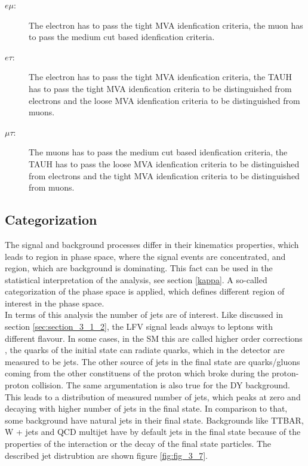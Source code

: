 \begin{description}
	\item [$e\mu$:] The electron has to pass the tight \gls{MVA} idenfication criteria, the muon has to pass the medium cut based idenfication criteria. 
	\item [$e\tau$:]  The electron has to pass the tight \gls{MVA} idenfication criteria, the \gls{TAUH} has to pass the tight \gls{MVA} idenfication criteria to be distinguished from electrons and the loose \gls{MVA} idenfication criteria to be distinguished from muons.
	\item [$\mu\tau$:]  The muons has to pass the medium cut based idenfication criteria, the \gls{TAUH} has to pass the loose \gls{MVA} idenfication criteria to be distinguished from electrons and the tight \gls{MVA} idenfication criteria to be distinguished from muons.
\end{description}


\subsection{Categorization}
\label{sec:section_3_2_3}

The signal and background processes differ in their kinematics properties, which leads to region in phase space, where the signal events are concentrated, and region, which are background is dominating. This fact can be used in the statistical interpretation of the analysis, see section \ref{kappa}. A so-called categorization of the phase space is applied, which defines different region of interest in the phase space. \\

In terms of this analysis the number of jets are of interest. Like discussed in section \ref{sec:section_3_1_2}, the \gls{LFV} signal leads always to leptons with different flavour. In some cases, in the \gls{SM} this are called higher order corrections \cite{Peskin}, the quarks of the initial state can radiate quarks, which in the detector are measured to be jets. The other source of jets in the final state are quarks/gluons coming from the other constituens of the proton which broke during the proton-proton collision. The same argumentation is also true for the \gls{DY} background. This leads to a distribution of measured number of jets, which peaks at zero and decaying with higher number of jets in the final state. In comparison to that, some background have natural jets in their final state. Backgrounds like \gls{TTBAR}, W + jets and \gls{QCD} multijet have by default jets in the final state because of the properties of the interaction or the decay of the final state particles. The described jet distrubtion are shown figure \ref{fig:fig_3_7}. 

